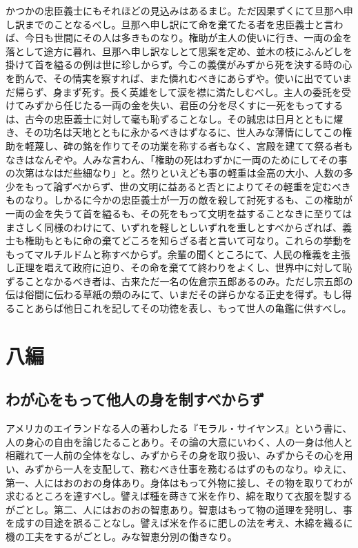 \documentclass[a4paper, platex, dvipdfmx]{jsarticle}
\begin{document}
かつかの忠臣義士にもそれほどの見込みはあるまじ。ただ因果ずくにて旦那へ申し訳までのことなるべし。旦那へ申し訳にて命を棄てたる者を忠臣義士と言わば、今日も世間にその人は多きものなり。権助が主人の使いに行き、一両の金を落として途方に暮れ、旦那へ申し訳なしとて思案を定め、並木の枝にふんどしを掛けて首を縊るの例は世に珍しからず。今この義僕がみずから死を決する時の心を酌んで、その情実を察すれば、また憐れむべきにあらずや。使いに出でていまだ帰らず、身まず死す。長く英雄をして涙を襟に満たしむべし。主人の委託を受けてみずから任じたる一両の金を失い、君臣の分を尽くすに一死をもってするは、古今の忠臣義士に対して毫も恥ずることなし。その誠忠は日月とともに燿き、その功名は天地とともに永かるべきはずなるに、世人みな薄情にしてこの権助を軽蔑し、碑の銘を作りてその功業を称する者もなく、宮殿を建てて祭る者もなきはなんぞや。人みな言わん、「権助の死はわずかに一両のためにしてその事の次第はなはだ些細なり」と。然りといえども事の軽重は金高の大小、人数の多少をもって論ずべからず、世の文明に益あると否とによりてその軽重を定むべきものなり。しかるに今かの忠臣義士が一万の敵を殺して討死するも、この権助が一両の金を失うて首を縊るも、その死をもって文明を益することなきに至りてはまさしく同様のわけにて、いずれを軽しとしいずれを重しとすべからざれば、義士も権助もともに命の棄てどころを知らざる者と言いて可なり。これらの挙動をもってマルチルドムと称すべからず。余輩の聞くところにて、人民の権義を主張し正理を唱えて政府に迫り、その命を棄てて終わりをよくし、世界中に対して恥ずることなかるべき者は、古来ただ一名の佐倉宗五郎あるのみ。ただし宗五郎の伝は俗間に伝わる草紙の類のみにて、いまだその詳らかなる正史を得ず。もし得ることあらば他日これを記してその功徳を表し、もって世人の亀鑑に供すべし。

\section{八編}
\subsection{わが心をもって他人の身を制すべからず}
アメリカのエイランドなる人の著わしたる『モラル・サイヤンス』という書に、人の身心の自由を論じたることあり。その論の大意にいわく、人の一身は他人と相離れて一人前の全体をなし、みずからその身を取り扱い、みずからその心を用い、みずから一人を支配して、務むべき仕事を務むるはずのものなり。ゆえに、第一、人にはおのおの身体あり。身体はもって外物に接し、その物を取りてわが求むるところを達すべし。譬えば種を蒔きて米を作り、綿を取りて衣服を製するがごとし。第二、人にはおのおの智恵あり。智恵はもって物の道理を発明し、事を成すの目途を誤ることなし。譬えば米を作るに肥しの法を考え、木綿を織るに機の工夫をするがごとし。みな智恵分別の働きなり。
\end{document}

